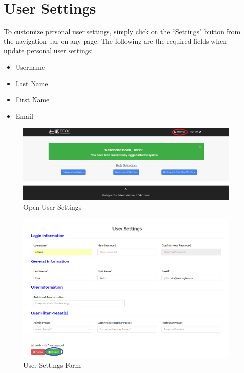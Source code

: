 \documentclass[fontsize=12pt,paper=letter,twoside]{scrartcl}
\begin{document}
\clearpage

\section{User Settings}
\label{user-settings}
To customize personal user settings, simply click on the ``Settings" button from the navigation bar on any page. The following are the required fields when update personal user settings:
\begin{itemize}
\item Username
\item Last Name
\item First Name
\item Email
\end{itemize}

\begin{figure}[!htb]
\begin{center}
\includegraphics[width=.99\textwidth]{images/click_settings.png}
\end{center}
\caption{Open User Settings}
\label{fig:click_settings}
\end{figure}

\begin{figure}[!htb]
\begin{center}
\includegraphics[width=.99\textwidth]{images/settings_form.png}
\end{center}
\caption{User Settings Form}
\label{fig:settings_form}
\end{figure}
\end{document}
